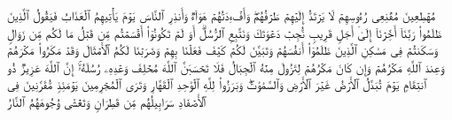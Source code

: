 \stopbuffer%
\startbuffer[\q:14:43]
مُهۡطِعِینَ مُقۡنِعِی رُءُوسِهِمۡ لَا یَرۡتَدُّ إِلَیۡهِمۡ طَرۡفُهُمۡۖ وَأَفۡءِدَتُهُمۡ هَوَاۤءࣱ%
\stopbuffer%
\startbuffer[\q:14:44]
وَأَنذِرِ ٱلنَّاسَ یَوۡمَ یَأۡتِیهِمُ ٱلۡعَذَابُ فَیَقُولُ ٱلَّذِینَ ظَلَمُوا۟ رَبَّنَاۤ أَخِّرۡنَاۤ إِلَىٰۤ أَجَلࣲ قَرِیبࣲ نُّجِبۡ دَعۡوَتَكَ وَنَتَّبِعِ ٱلرُّسُلَۗ أَوَ لَمۡ تَكُونُوۤا۟ أَقۡسَمۡتُم مِّن قَبۡلُ مَا لَكُم مِّن زَوَالࣲ%
\stopbuffer%
\startbuffer[\q:14:45]
وَسَكَنتُمۡ فِی مَسَٰكِنِ ٱلَّذِینَ ظَلَمُوۤا۟ أَنفُسَهُمۡ وَتَبَیَّنَ لَكُمۡ كَیۡفَ فَعَلۡنَا بِهِمۡ وَضَرَبۡنَا لَكُمُ ٱلۡأَمۡثَالَ%
\stopbuffer%
\startbuffer[\q:14:46]
وَقَدۡ مَكَرُوا۟ مَكۡرَهُمۡ وَعِندَ ٱللَّهِ مَكۡرُهُمۡ وَإِن كَانَ مَكۡرُهُمۡ لِتَزُولَ مِنۡهُ ٱلۡجِبَالُ%
\stopbuffer%
\startbuffer[\q:14:47]
فَلَا تَحۡسَبَنَّ ٱللَّهَ مُخۡلِفَ وَعۡدِهِۦ رُسُلَهُۥۤۚ إِنَّ ٱللَّهَ عَزِیزࣱ ذُو ٱنتِقَامࣲ%
\stopbuffer%
\startbuffer[\q:14:48]
یَوۡمَ تُبَدَّلُ ٱلۡأَرۡضُ غَیۡرَ ٱلۡأَرۡضِ وَٱلسَّمَٰوَٰتُۖ وَبَرَزُوا۟ لِلَّهِ ٱلۡوَٰحِدِ ٱلۡقَهَّارِ%
\stopbuffer%
\startbuffer[\q:14:49]
وَتَرَى ٱلۡمُجۡرِمِینَ یَوۡمَئِذࣲ مُّقَرَّنِینَ فِی ٱلۡأَصۡفَادِ%
\stopbuffer%
\startbuffer[\q:14:50]
سَرَابِیلُهُم مِّن قَطِرَانࣲ وَتَغۡشَىٰ وُجُوهَهُمُ ٱلنَّارُ%
\stopbuffer%
